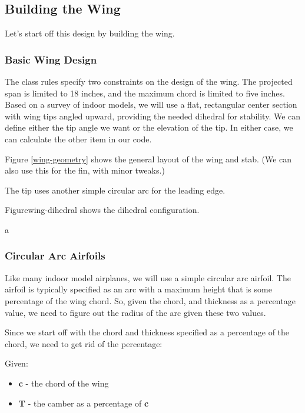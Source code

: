 \subsection{Building the Wing}

Let's start off this design by building the wing.

\subsubsection*{Basic Wing Design}

The class rules specify two constraints on the design of the wing. The projected
span is limited to 18 inches, and the maximum chord is limited to five inches.
Based on a survey of indoor models, we will use a flat, rectangular center section with wing
tips angled upward, providing the needed dihedral for stability. We can define
either the tip angle we want or the elevation of the tip. In either case, we can
calculate the other item in our code.


Figure \ref{wing-geometry} shows the general layout of the wing and stab. (We
can also use this for the fin, with minor tweaks.)


The tip uses another simple circular arc for the leading edge.

Figure{wing-dihedral} shows the dihedral configuration.


a

\subsubsection{Circular Arc Airfoils}

Like many indoor model airplanes, we will use a simple circular arc airfoil.
The airfoil is typically specified as an arc with a maximum height that is some
percentage of the wing chord.  So, given the chord, and thickness as a
percentage value, we need to figure out the radius of the arc given these two
values.

Since we start off with the chord and thickness specified as a percentage of the chord, we
need to get rid of the percentage:

Given:

\begin{itemize}
  \item{{\bf c} - the chord of the wing}
  \item{{\bf T} - the camber as a percentage of {\bf c}}
\end{itemize}


